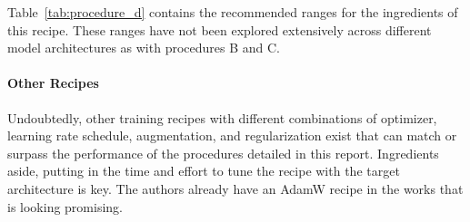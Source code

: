 Table~\ref{tab:procedure_d} contains the recommended ranges for the ingredients of this recipe. These ranges have not been explored extensively across different model architectures as with procedures B and C.


\begin{table}[p]
\centering
{}
\smallskip
\caption{Procedure \Dp~ summary 
\label{tab:procedure_d}}
\end{table}

\paragraph{Other Recipes}

Undoubtedly, other training recipes with different combinations of optimizer, learning rate schedule, augmentation, and regularization exist that can match or surpass the performance of the procedures detailed in this report. Ingredients aside, putting in the time and effort to tune the recipe with the target architecture is key. The authors already have an AdamW recipe in the works that is looking promising. 

